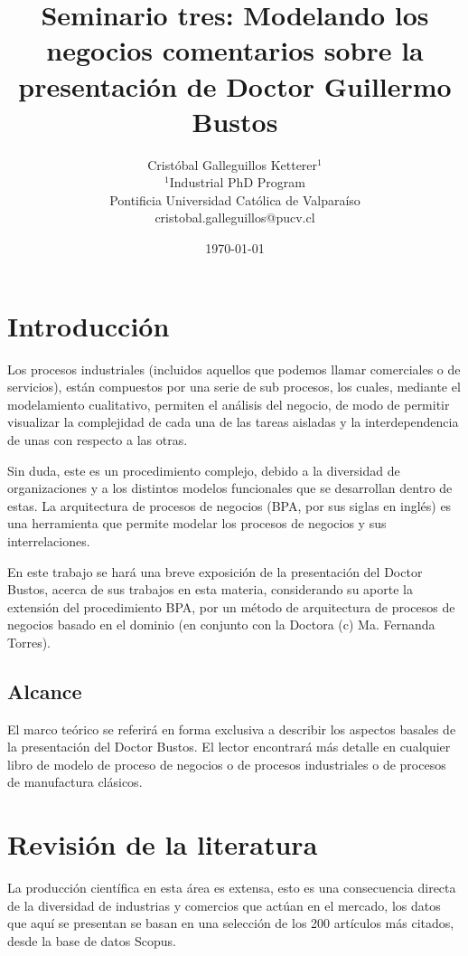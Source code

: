 \documentclass{article}
\title{Seminario tres: Modelando los negocios comentarios sobre la presentación de Doctor Guillermo Bustos}
\author{Cristóbal Galleguillos Ketterer$^{1}$\\
\small{$^{1}$Industrial PhD Program}\\
\small{Pontificia Universidad Católica de Valparaíso}\\
\small{cristobal.galleguillos@pucv.cl}
}
\date{\small{\today}}
\begin{document}
\maketitle

\section{Introducción}

Los procesos industriales (incluidos aquellos que podemos llamar comerciales o de servicios), están compuestos por una serie de sub procesos, los cuales, mediante el modelamiento cualitativo, permiten el análisis del negocio, de modo de permitir visualizar la complejidad de cada una de las tareas aisladas y la interdependencia de unas con respecto a las otras.

Sin duda, este es un procedimiento complejo, debido a la diversidad de organizaciones y a los distintos modelos funcionales que se desarrollan dentro de estas. La arquitectura de procesos de negocios (BPA, por sus siglas en inglés) es una herramienta que permite modelar los procesos de negocios y sus interrelaciones.

En este trabajo se hará una breve exposición de la presentación del Doctor Bustos, acerca de sus trabajos en esta materia, considerando su aporte la extensión del procedimiento BPA, por un método de arquitectura de procesos de negocios basado en el dominio (en conjunto con la Doctora (c) Ma. Fernanda Torres).


\subsection{Alcance}

El marco teórico se referirá en forma exclusiva a describir los aspectos basales de la presentación del Doctor Bustos. El lector encontrará más detalle en cualquier libro de modelo de proceso de negocios o de procesos industriales o de procesos de manufactura clásicos.

\section{Revisión de la literatura}

La producción científica en esta área es extensa, esto es una consecuencia directa de la diversidad de industrias y comercios que actúan en el mercado, los datos que aquí se presentan se basan en una selección de los 200 artículos más citados, desde la base de datos Scopus.
\end{document}
